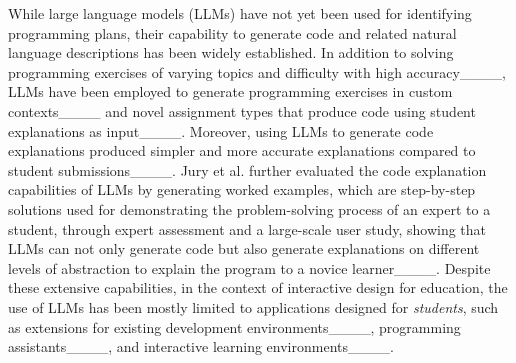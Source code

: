 While large language models (LLMs) have not yet been used for identifying programming plans, their capability to generate code and related natural language descriptions has been widely established. In addition to solving programming exercises of varying topics and difficulty with high accuracy____, LLMs have been employed to generate programming exercises in custom contexts____ and novel assignment types that produce code using student explanations as input____. Moreover, using LLMs to generate code explanations produced simpler and more accurate explanations compared to student submissions____. Jury et al. further evaluated the code explanation capabilities of LLMs by generating worked examples, which are step-by-step solutions used for demonstrating the problem-solving process of an expert to a student, through expert assessment and a large-scale user study, showing that LLMs can not only generate code but also generate explanations on different levels of abstraction to explain the program to a novice learner____. Despite these extensive capabilities, in the context of interactive design for education, the use of LLMs has been mostly limited to applications designed for \textit{students}, such as extensions for existing development environments____, programming assistants____, and interactive learning environments____.

